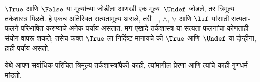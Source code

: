 \documentclass[../../../include/open-logic-section]{subfiles}
\begin{document}


$\True$ आणि $\False$ या मूल्यांच्या जोडीला आणखी एक मूल्य~$\Undef$
जोडले, तर त्रिमूल्य तर्कशास्त्र मिळते. हे एकच अतिरिक्त
सत्यतामूल्य असले, तरी $\lnot$, $\land$, $\lor$ आणि $\lif$
यांसाठी सत्यता-फलने परिभाषित करण्याचे अनेक पर्याय असतात.
मग एखादे तर्कशास्त्र या सत्यता-फलनांचा कोणताही संयोग वापरू
शकते; तसेच फक्त $\True$ ला निर्दिष्ट मानायचे की $\True$
आणि~$\Undef$ या दोन्हींना, हाही पर्याय असतो.

येथे आपण सर्वाधिक परिचित त्रिमूल्य तर्कशास्त्रांपैकी काही,
त्यांमागील प्रेरणा आणि त्यांचे काही गुणधर्म मांडतो.
\end{document}
